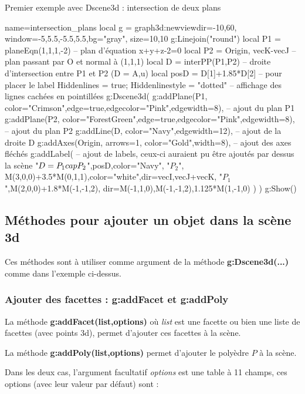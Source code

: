 \begin{demo}[plans]{Premier exemple avec Dscene3d : intersection de deux plans}
\begin{luadraw}{name=intersection_plans}
local g = graph3d:new{viewdir={-10,60}, window={-5,5.5,-5.5,5.5},bg="gray", size={10,10}}
g:Linejoin("round")
local P1 = planeEqn(1,1,1,-2) -- plan d'équation x+y+z-2=0
local P2 = {Origin, vecK-vecJ} -- plan passant par O et normal à (1,1,1)
local D = interPP(P1,P2) -- droite d'intersection entre P1 et P2 (D = {A,u})
local posD = D[1]+1.85*D[2] -- pour placer le label
Hiddenlines = true; Hiddenlinestyle = "dotted" -- affichage des lignes cachées en pointillées
g:Dscene3d(
    g:addPlane(P1, {color="Crimson",edge=true,edgecolor="Pink",edgewidth=8}), -- ajout du plan P1
    g:addPlane(P2, {color="ForestGreen",edge=true,edgecolor="Pink",edgewidth=8}),  -- ajout du plan P2
    g:addLine(D, {color="Navy",edgewidth=12}),  -- ajout de la droite D
    g:addAxes(Origin, {arrows=1, color="Gold",width=8}),  -- ajout des axes fléchés
    g:addLabel( -- ajout de labels, ceux-ci auraient pu être ajoutés par dessus la scène
        "$D=P_1\\cap P_2$",posD,{color="Navy"},
        "$P_2$", M(3,0,0)+3.5*M(0,1,1),{color="white",dir={vecI,vecJ+vecK}},
        "$P_1$",M(2,0,0)+1.8*M(-1,-1,2), {dir={M(-1,1,0),M(-1,-1,2),1.125*M(1,-1,0)}}
        )
    )
g:Show()
\end{luadraw}
\end{demo}

\subsection{Méthodes pour ajouter un objet dans la scène 3d}

Ces méthodes sont à utiliser comme argument de la méthode \textbf{g:Dscene3d(...)} comme dans l'exemple ci-dessus.

\subsubsection{Ajouter des facettes : g:addFacet et g:addPoly}

La méthode \textbf{g:addFacet(list,options)} où \emph{list} est une facette ou bien une liste de facettes (avec points 3d), permet d'ajouter ces facettes à la scène. 

La méthode \textbf{g:addPoly(list,options)} permet d'ajouter le polyèdre $P$ à la scène. 

Dans les deux cas, l'argument facultatif \emph{options} est une table à 11 champs, ces options (avec leur valeur par défaut) sont :

